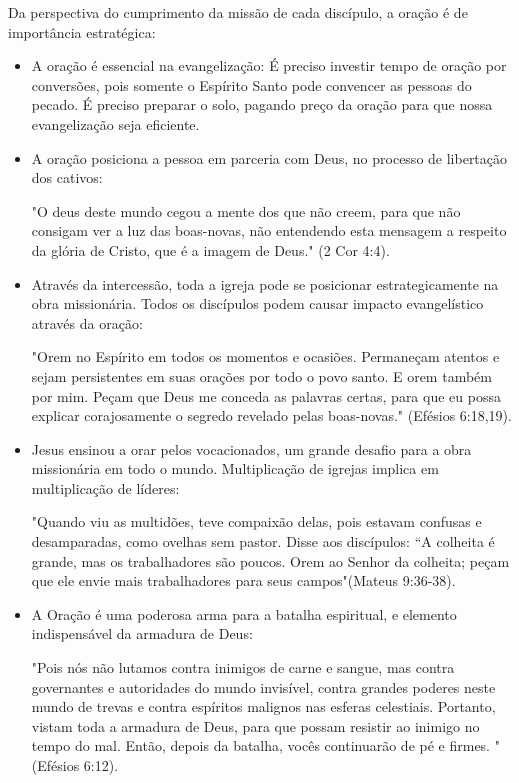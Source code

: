 \documentclass[12pt,openright,oneside,a4paper]{abntex2}
\begin{document}
  Da perspectiva do cumprimento da missão de cada discípulo, a oração é de importância estratégica:

  \begin{itemize}
	\item A oração é essencial na evangelização: É preciso investir tempo de oração por conversões, pois somente o Espírito Santo pode convencer as pessoas do pecado.  É preciso preparar o solo, pagando preço da oração para que nossa evangelização seja eficiente.
	\item A oração posiciona a pessoa em parceria com Deus, no processo de libertação dos cativos: \begin{citacao}"O deus deste mundo cegou a mente dos que não creem, para que não consigam ver a luz das boas-novas, não entendendo esta mensagem a respeito da glória de Cristo, que é a imagem de Deus." (2 Cor 4:4).\end{citacao}
	\item Através da intercessão, toda a igreja pode se posicionar estrategicamente na obra missionária. Todos os discípulos podem causar impacto evangelístico através da oração: \begin{citacao}"Orem no Espírito em todos os momentos e ocasiões. Permaneçam atentos e sejam persistentes em suas orações por todo o povo santo. E orem também por mim. Peçam que Deus me conceda as palavras certas, para que eu possa explicar corajosamente o segredo revelado pelas boas-novas." (Efésios 6:18,19).\end{citacao}
	\item Jesus ensinou a orar pelos vocacionados, um grande desafio para a obra missionária em todo o mundo. Multiplicação de igrejas implica em multiplicação de líderes: \begin{citacao}"Quando viu as multidões, teve compaixão delas, pois estavam confusas e desamparadas, como ovelhas sem pastor. Disse aos discípulos: “A colheita é grande, mas os trabalhadores são poucos. Orem ao Senhor da colheita; peçam que ele envie mais trabalhadores para seus campos"(Mateus 9:36-38).\end{citacao}
	\item A Oração é uma poderosa arma para a batalha espiritual, e elemento indispensável da armadura de Deus: \begin{citacao}"Pois nós não lutamos contra inimigos de carne e sangue, mas contra governantes e autoridades do mundo invisível, contra grandes poderes neste mundo de trevas e contra espíritos malignos nas esferas celestiais. Portanto, vistam toda a armadura de Deus, para que possam resistir ao inimigo no tempo do mal. Então, depois da batalha, vocês continuarão de pé e firmes. "(Efésios 6:12).\end{citacao}
  
	\cite[p. 32-34]{brandao}
\end{itemize}
\end{document}

